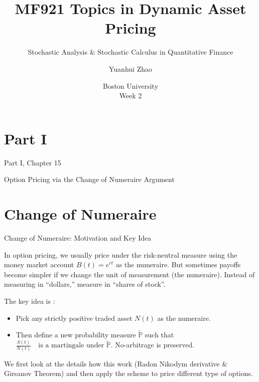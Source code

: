 \documentclass{beamer}
\title{MF921 Topics in Dynamic Asset Pricing}
\subtitle{Stochastic Analysis \& Stochastic Calculus in Quantitative Finance}
\author{Yuanhui Zhao}
\date{Boston University \\ \;\;Week 2}
\begin{document}
\frame{\titlepage}
\section{Part I}
\begin{frame}{Part I, Chapter 15}
    \begin{center}
    Option
    Pricing via the Change of
    Numeraire Argument
    \end{center}
\end{frame}
\section{Change of Numeraire}
\begin{frame}{Change of Numeraire: Motivation and Key Idea}
    \par In option pricing, we usually price under the risk-neutral measure using 
    the money market account $B(t) = e^{rt}$ as the numeraire. 
    But sometimes payoffs become simpler if we change the unit of measurement (the numeraire).
    Instead of measuring in “dollars,” measure in “shares of stock”.\pause
    \vspace{1em}
    \par The key idea is :
    \begin{itemize}
        \item Pick any strictly positive traded asset $N(t)$ as the numeraire.
        \item Then define a new probability measure $\tilde{\mathbb{P}}$ such that 
        $\frac{S(t)}{N(t)} \quad \text{is a martingale under } \tilde{\mathbb{P}}.$ No-arbitrage is preserved.
    \end{itemize}\pause
    \vspace{1em}
    \par We first look at the details how this work (Radon Nikodym derivative \& Girsanov Theorem) and 
    then apply the scheme to price different type of options. 
\end{frame}
\end{document}
